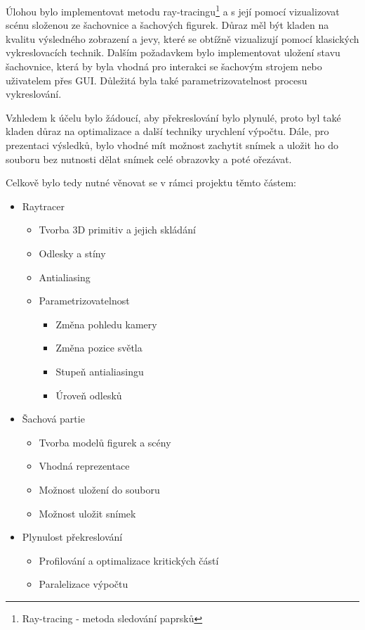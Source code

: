 \documentclass[12pt,a4paper,titlepage,final]{report}
\begin{document}
Úlohou bylo implementovat metodu ray-tracingu\footnote{Ray-tracing - metoda  sledování paprsků} a s její pomocí vizualizovat scénu složenou ze šachovnice a šachových figurek. Důraz měl být kladen na kvalitu výsledného zobrazení a jevy, které se obtížně vizualizují pomocí klasických vykreslovacích technik. Dalším požadavkem bylo implementovat uložení stavu šachovnice, která by byla vhodná pro interakci se šachovým strojem nebo uživatelem přes GUI. Důležitá byla také parametrizovatelnost procesu vykreslování.

Vzhledem k účelu bylo žádoucí, aby překreslování bylo plynulé, proto byl také kladen důraz na optimalizace a další techniky urychlení výpočtu. Dále, pro prezentaci výsledků, bylo vhodné mít možnost zachytit snímek a uložit ho do souboru bez nutnosti dělat snímek celé obrazovky a poté ořezávat. 

Celkově bylo tedy nutné věnovat se v rámci projektu těmto částem:
\begin{itemize}
	\item Raytracer
	\begin{itemize}
	    \item Tvorba 3D primitiv a jejich skládání
		\item Odlesky a stíny
		\item Antialiasing
		\item Parametrizovatelnost
		\begin{itemize}
			\item Změna pohledu kamery
			\item Změna pozice světla
			\item Stupeň antialiasingu
			\item Úroveň odlesků
		\end{itemize}
	\end{itemize}
	\item Šachová partie
	\begin{itemize}
	    \item Tvorba modelů figurek a scény
		\item Vhodná reprezentace
		\item Možnost uložení do souboru
		\item Možnost uložit snímek 
	\end{itemize}
	\item Plynulost překreslování
	\begin{itemize}
		\item Profilování a optimalizace kritických částí
		\item Paralelizace výpočtu
	\end{itemize}
\end{itemize}
\end{document}

